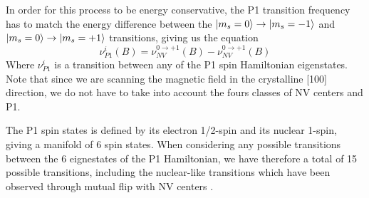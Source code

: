 \documentclass{article}
\begin{document}
In order for this process to be energy conservative, the P1 transition frequency has to match the energy difference between the $\ket{m_s=0} \to \ket{m_s=-1}$ and $\ket{m_s=0} \to \ket{m_s=+1}$ transitions, giving us the equation \begin{equation}
\label{eq_P1}
\nu^i_{P1}(B)=\nu^{0 \to +1}_{NV}(B)-\nu^{0 \to +1}_{NV}(B)
\end{equation}
Where $\nu^i_{P1}$ is a transition between any of the P1 spin Hamiltonian eigenstates. Note that since we are scanning the magnetic field in the crystalline [100] direction, we do not have to take into account the fours classes of NV centers and P1.

The P1 spin states is defined by its  electron 1/2-spin and its nuclear 1-spin, giving a manifold of 6 spin states. When considering any possible transitions between the 6 eignestates of the P1 Hamiltonian, we have therefore a total of 15 possible transitions, including the nuclear-like transitions which have been observed through mutual flip with NV centers \citep{alfasi2019detection}. 
\end{document}
